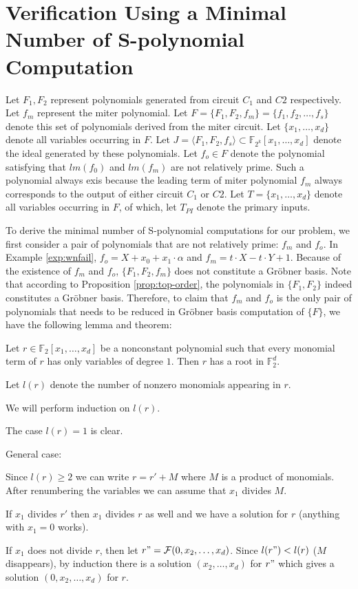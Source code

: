 \section{Verification Using a Minimal Number of S-polynomial Computation}


Let $F_1, F_2$ represent polynomials generated from circuit $C_1$ and $C2$ respectively.
Let $f_m$ represent the miter polynomial.
Let $F=\{F_1,F_2,f_m\}=\{f_1,f_2,\ldots,f_s\}$ denote this set of polynomials derived from the miter circuit. 
Let $\{x_1,\dots,x_d\}$ denote all variables occurring in $F$.
Let $J = \langle F_1,F_2,f_s\rangle \subset \mathbb{F}_{2^k}[x_{1},\dots,x_{d}]$ denote the ideal generated by these polynomials.
Let $f_o \in F$ denote the polynomial satisfying that $lm(f_0)$ and $lm(f_m)$ are not relatively prime. 
Such a polynomial always exis because the leading term of miter polynomial $f_{m}$ always corresponds 
to the output of either circuit $C_1$ or $C2$. 
Let $T=\{x_1,\dots,x_d\}$ denote all variables occurring in $F$, of which, let $T_{PI}$ denote the primary inputs.

To derive the minimal number of S-polynomial computations for our problem, 
we first consider a pair of polynomials that are not relatively prime: $f_{m}$ and $f_{o}$.
In Example \ref{exp:wnfail}, $f_o=X+x_0+x_1\cdot \alpha$ and $f_m=t\cdot X-t\cdot Y+1$. 
Because of the existence of $f_{m}$ and $f_{o}$, $\{F_1,F_2,f_m\}$ does not constitute a Gr\"obner basis. 
Note that according to Proposition \ref{prop:top-order}, the polynomials in $\{F_1,F_2\}$ indeed constitutes a Gr\"obner basis.
Therefore, to claim that $f_{m}$ and $f_{o}$ is the only pair of polynomials that needs to be reduced in Gr\"obner basis computation
of $\{ F \}$, we have the following lemma and theorem: 

\begin{Lemma}\label{lem:root}
Let $r \in \mathbb{F}_2[x_1, \dots, x_d]$ be a nonconstant polynomial 
such that every monomial term of $r$ has only variables of degree $1$. 
Then $r$ has a root in $\mathbb{F}_2^d$.
\end{Lemma}

\begin{Proof}
Let $l(r)$ denote the number of nonzero monomials appearing in $r$.

We will perform induction on $l(r)$.

The case $l(r)=1$ is clear.

General case:

Since $l(r) \geq 2$ we can write $r =  r' +M$ where $M$ is a product of monomials. 
After renumbering the variables we can assume that $x_1$ divides $M$.

If $x_1$ divides $r'$ then $x_1$ divides $r$ as well and we have a solution for $r$ (anything with $x_1=0$ works).

If $x_1$ does not divide $r$, then let $r"=\mathcal{F}(0, x_2,\ldots, x_d)$. Since $l(r") < l(r)$ ($M$ disappears), 
by induction there is a solution $(x_2, \dots, x_d)$ for $r"$ which gives a solution $(0, x_2, \ldots, x_d)$ for $r$.
\end{Proof}


